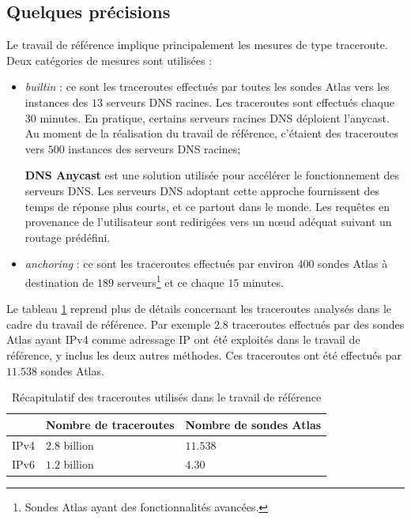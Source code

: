

\subsection{Quelques précisions}

Le travail de référence \cite{DBLP:journals/corr/FontugneAPB16} implique principalement les mesures de type  traceroute. Deux catégories de mesures sont utilisées :

\begin{itemize}
	\item \textit{builtin} : ce sont les traceroutes effectués par toutes les sondes Atlas vers les instances des  $13$ serveurs DNS racines. Les traceroutes sont effectués chaque $30$ minutes. En pratique, certains serveurs racines DNS déploient l'anycast. Au moment de la réalisation du travail de référence\cite{DBLP:journals/corr/FontugneAPB16}, c'étaient des traceroutes vers $ 500 $ instances des serveurs DNS racines;
	\begin{tcolorbox}
		\textbf{DNS Anycast} est une solution   utilisée pour accélérer le fonctionnement  des serveurs DNS. Les serveurs DNS adoptant cette approche fournissent des temps de réponse plus courts, et ce partout dans le monde. Les requêtes en provenance de l'utilisateur sont redirigées vers un n\oe{}ud adéquat suivant un routage prédéfini. 
	\end{tcolorbox}
	
	\item \textit{anchoring} : ce sont les traceroutes effectués par environ $400$ sondes Atlas à destination de $189$ serveurs\footnote{Sondes Atlas ayant des fonctionnalités avancées.} et ce chaque $15$ minutes.
\end{itemize}

 Le tableau \ref{tab:dataset} reprend plus de détails  concernant les traceroutes analysés dans le cadre du travail de référence. Par exemple $2.8$ traceroutes effectués par des sondes Atlas ayant IPv4 comme adressage IP  ont été exploités dans le travail de référence, y inclus les deux autres méthodes. Ces traceroutes ont été effectués par $11.538$ sondes Atlas.

\begin{table}[H]
	\centering
	\begin{tabular}{|l|l|l|}
		\hline
		& \textbf{Nombre de traceroutes}& \textbf{Nombre de sondes Atlas }\\ \hline
		IPv4		&$ 2.8 $ billion & $ 11.538 $\\ \hline
		IPv6	&	$ 1.2 $ billion & $ 4.30 $ \\ \hline
	\end{tabular}
	\caption{Récapitulatif des traceroutes utilisés dans le travail de référence }
	\label{tab:dataset}
\end{table}

